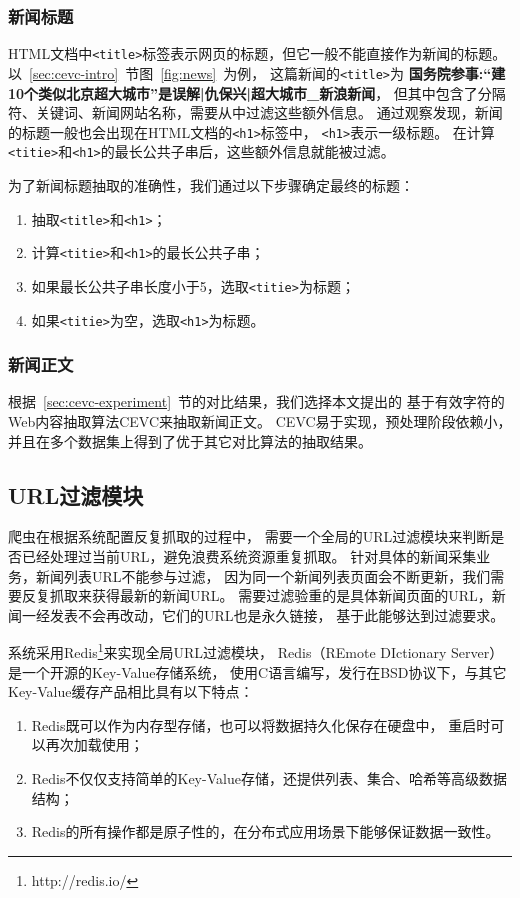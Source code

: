 \subsubsection{新闻标题}
HTML文档中\texttt{<title>}标签表示网页的标题，但它一般不能直接作为新闻的标题。
以~\ref{sec:cevc-intro}~节图~\ref{fig:news}~为例，
这篇新闻的\texttt{<title>}为
\textbf{国务院参事:“建10个类似北京超大城市”是误解|仇保兴|超大城市\_新浪新闻}，
但其中包含了分隔符、关键词、新闻网站名称，需要从中过滤这些额外信息。
通过观察发现，新闻的标题一般也会出现在HTML文档的\texttt{<h1>}标签中，
\texttt{<h1>}表示一级标题。
在计算\texttt{<titie>}和\texttt{<h1>}的最长公共子串后，这些额外信息就能被过滤。

为了新闻标题抽取的准确性，我们通过以下步骤确定最终的标题：
\begin{enumerate}
\item 抽取\texttt{<title>}和\texttt{<h1>}；
\item 计算\texttt{<titie>}和\texttt{<h1>}的最长公共子串；
\item 如果最长公共子串长度小于5，选取\texttt{<titie>}为标题；
\item 如果\texttt{<titie>}为空，选取\texttt{<h1>}为标题。
\end{enumerate}

\subsubsection{新闻正文}
根据~\ref{sec:cevc-experiment}~节的对比结果，我们选择本文提出的
基于有效字符的Web内容抽取算法CEVC来抽取新闻正文。
CEVC易于实现，预处理阶段依赖小，并且在多个数据集上得到了优于其它对比算法的抽取结果。

\subsection{URL过滤模块}
爬虫在根据系统配置反复抓取的过程中，
需要一个全局的URL过滤模块来判断是否已经处理过当前URL，避免浪费系统资源重复抓取。
针对具体的新闻采集业务，新闻列表URL不能参与过滤，
因为同一个新闻列表页面会不断更新，我们需要反复抓取来获得最新的新闻URL。
需要过滤验重的是具体新闻页面的URL，新闻一经发表不会再改动，它们的URL也是永久链接，
基于此能够达到过滤要求。

系统采用Redis\footnote{http://redis.io/}来实现全局URL过滤模块，
Redis（REmote DIctionary Server）是一个开源的Key-Value存储系统，
使用C语言编写，发行在BSD协议下，与其它Key-Value缓存产品相比具有以下特点：
\begin{enumerate}
\item Redis既可以作为内存型存储，也可以将数据持久化保存在硬盘中，
重启时可以再次加载使用；
\item Redis不仅仅支持简单的Key-Value存储，还提供列表、集合、哈希等高级数据结构；
\item Redis的所有操作都是原子性的，在分布式应用场景下能够保证数据一致性。
\end{enumerate}


